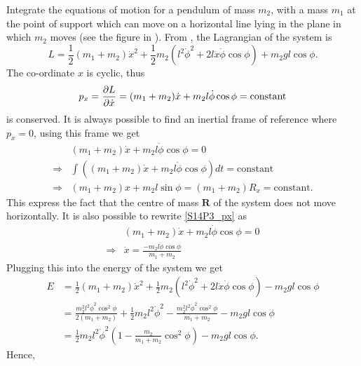 \begin{problem}[title={Integrating the sliding-support pendulum}]
{
Integrate the equations of motion for a pendulum of mass $m_2$, with a mass $m_1$ at the point of support which can move on a horizontal line lying in the plane in which $m_2$ moves (see the figure in ).
}
{
From , the Lagrangian of the system is
\begin{equation*}
    L = \frac{1}{2} (m_1 + m_2) \Dot{x}^2 +  \frac{1}{2} m_2 (l^2 \Dot{\phi}^2 + 2 l \Dot{x} \Dot{\phi} \cos{\phi} ) + m_2 g l \cos{\phi}.
\end{equation*}
The co-ordinate $x$ is cyclic, thus
\begin{equation} \label{S14P3_px}
    p_x = \frac{\partial L}{\partial \Dot{x}} = (m_1 + m_2) \Dot{x} + m_2 l \Dot{\phi} \cos{\phi} = \text{constant}
\end{equation}
is conserved. It is always possible to find an inertial frame of reference where $p_x=0$, using this frame we get
\begin{align}
    &(m_1 + m_2) \Dot{x} + m_2 l \Dot{\phi} \cos{\phi} = 0 \nonumber \\
    \Rightarrow &\int \left( (m_1 + m_2) \Dot{x} + m_2 l \Dot{\phi} \cos{\phi} \right)dt = \text{constant} \nonumber \\
    \Rightarrow &(m_1 + m_2) x + m_2 l \sin{\phi} = (m_1+m_2)R_x = \text{constant} . \label{S14P3_Rx}
\end{align}
This express the fact that the centre of mass $\mathbf{R}$ of the system does not move horizontally. It is also possible to rewrite \eqref{S14P3_px} as
\begin{align*}
    &(m_1 + m_2) \Dot{x} + m_2 l \Dot{\phi} \cos{\phi} = 0\\
    \Rightarrow&\Dot{x} = \frac{-m_2l\Dot{\phi}\cos{\phi}}{m_1+m_2}
\end{align*}
Plugging this into the energy of the system we get
\begin{align*}
    E &= \frac{1}{2} (m_1 + m_2) \Dot{x}^2 +  \frac{1}{2} m_2 (l^2 \Dot{\phi}^2 + 2 l \Dot{x} \Dot{\phi} \cos{\phi} ) - m_2 g l \cos{\phi} \\
    &= \frac{m_2^2l^2\Dot{\phi}^2\cos^2{\phi}}{2(m_1+m_2)} +  \frac{1}{2} m_2 l^2 \Dot{\phi}^2 -  \frac{m_2^2l^2\Dot{\phi}^2\cos^2{\phi}}{m_1+m_2} - m_2 g l \cos{\phi} \\
    &= \frac{1}{2}m_2l^2\Dot{\phi}^2 \left( 1 -\frac{m_2}{m_1+m_2}\cos^2{\phi} \right) - m_2 g l \cos{\phi}.
\end{align*}
Hence,
\begin{align*}

\end{align*}}
\end{problem}
